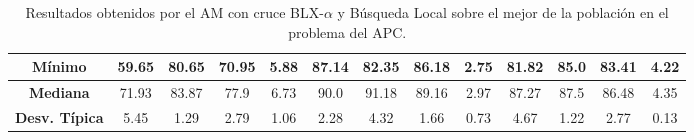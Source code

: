 \documentclass[11pt,a4paper]{article}
\begin{document}
\begin{table}[H]
{\begin{tabular}{c|c|c|c|c|c|c|c|c|c|c|c|c|}
\multicolumn{1}{|c|}{\textbf{Mínimo}}       & 59.65             & 80.65                   & 70.95         & 5.88       & 87.14             & 82.35          & 86.18         & 2.75       & 81.82             & 85.0           & 83.41         & 4.22       \\ \hline
\multicolumn{1}{|c|}{\textbf{Mediana}}      & 71.93             & 83.87                   & 77.9          & 6.73       & 90.0              & 91.18          & 89.16         & 2.97       & 87.27             & 87.5           & 86.48         & 4.35       \\ \hline
\multicolumn{1}{|c|}{\textbf{Desv. Típica}} & 5.45              & 1.29                    & 2.79          & 1.06       & 2.28              & 4.32           & 1.66          & 0.73       & 4.67              & 1.22           & 2.77          & 0.13       \\ \hline
\end{tabular}
}%
\caption{Resultados obtenidos por el AM con cruce BLX-$\alpha$ y Búsqueda Local sobre el mejor de la población en el problema
del APC.}
\end{table}
\end{document}
